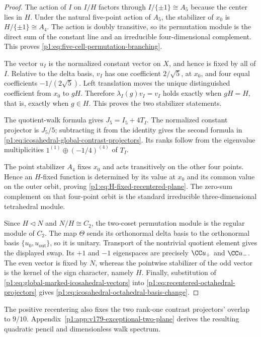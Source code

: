 \documentclass[11pt]{article}
\begin{document}
\begin{proof}
The action of \(I\) on \(I/H\) factors through
\(I/\{\pm1\}\cong A_5\) because the center lies in \(H\).  Under the natural
five-point action of \(A_5\), the stabilizer of \(x_0\) is
\(H/\{\pm1\}\cong A_4\).  The action is doubly transitive, so its permutation
module is the direct sum of the constant line and an irreducible
four-dimensional complement.  This proves
\eqref{p1:eq:five-cell-permutation-branching}.

The vector \(u_I\) is the normalized constant vector on \(X\), and hence is
fixed by all of \(I\).  Relative to the delta basis, \(v_I\) has one
coefficient \(2/\sqrt5\), at \(x_0\), and four equal coefficients
\(-1/(2\sqrt5)\).  Left translation moves the unique distinguished
coefficient from \(x_0\) to \(gH\).  Therefore
\(\lambda_I(g)v_I=v_I\) holds exactly when \(gH=H\), that is, exactly when
\(g\in H\).  This proves the two stabilizer statements.

The quotient-walk formula gives \(J_5=I_5+4T_I\).  The normalized constant
projector is \(J_5/5\); subtracting it from the identity gives the second
formula in \eqref{p1:eq:icosahedral-global-contrast-projectors}.  Its ranks
follow from the eigenvalue multiplicities
\(1^{(1)}\oplus(-1/4)^{(4)}\) of \(T_I\).

The point stabilizer \(A_4\) fixes \(x_0\) and acts transitively on the other
four points.  Hence an \(H\)-fixed function is determined by its value at
\(x_0\) and its common value on the outer orbit, proving
\eqref{p1:eq:H-fixed-recentered-plane}.  The zero-sum complement on that
four-point orbit is the standard irreducible three-dimensional tetrahedral
module.

Since \(H\triangleleft N\) and \(N/H\cong C_2\), the two-coset permutation
module is the regular module of \(C_2\).  The map \(\Theta\) sends its
orthonormal delta basis to the orthonormal basis
\(\{u_0,u_{\mathrm{out}}\}\), so it is unitary.  Transport of the nontrivial
quotient element gives the displayed swap.  Its \(+1\) and \(-1\)
eigenspaces are precisely \(\CC u_+\) and \(\CC u_-\).  The even vector is
fixed by \(N\), whereas the pointwise stabilizer of the odd vector is the
kernel of the sign character, namely \(H\).  Finally, substitution of
\eqref{p1:eq:global-marked-icosahedral-vectors} into
\eqref{p1:eq:recentered-octahedral-projectors} gives
\eqref{p1:eq:icosahedral-octahedral-basis-change}.
\end{proof}

The positive recentering also fixes the two rank-one contrast projectors'
overlap to \(9/10\).  Appendix~\ref{p1:app:v179-exceptional-two-plane}
derives the resulting quadratic pencil and dimensionless walk spectrum.
\end{document}
